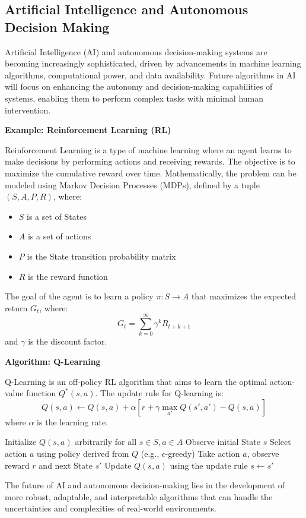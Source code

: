 \documentclass[12pt]{book} %
\begin{document}
\subsection{Artificial Intelligence and Autonomous Decision Making}
Artificial Intelligence (AI) and autonomous decision-making systems are becoming increasingly sophisticated, driven by advancements in machine learning algorithms, computational power, and data availability. Future algorithms in AI will focus on enhancing the autonomy and decision-making capabilities of systems, enabling them to perform complex tasks with minimal human intervention.

\textbf{Example: Reinforcement Learning (RL)}

Reinforcement Learning is a type of machine learning where an agent learns to make decisions by performing actions and receiving rewards. The objective is to maximize the cumulative reward over time. Mathematically, the problem can be modeled using Markov Decision Processes (MDPs), defined by a tuple \((S, A, P, R)\), where:
\begin{itemize}
    \item \(S\) is a set of States
    \item \(A\) is a set of actions
    \item \(P\) is the State transition probability matrix
    \item \(R\) is the reward function
\end{itemize}

The goal of the agent is to learn a policy \(\pi: S \to A\) that maximizes the expected return \(G_t\), where:
\[
G_t = \sum_{k=0}^{\infty} \gamma^k R_{t+k+1}
\]
and \(\gamma\) is the discount factor.

\textbf{Algorithm: Q-Learning}

Q-Learning is an off-policy RL algorithm that aims to learn the optimal action-value function \(Q^*(s, a)\). The update rule for Q-learning is:
\[
Q(s, a) \leftarrow Q(s, a) + \alpha \left[ r + \gamma \max_{a'} Q(s', a') - Q(s, a) \right]
\]
where \(\alpha\) is the learning rate.
\FloatBarrier
\begin{algorithm}
\caption{Q-Learning Algorithm}
\begin{algorithmic}[1]
\State Initialize \(Q(s, a)\) arbitrarily for all \(s \in S, a \in A\)
\State Observe initial State \(s\)
        \State Select action \(a\) using policy derived from \(Q\) (e.g., \(\epsilon\)-greedy)
        \State Take action \(a\), observe reward \(r\) and next State \(s'\)
        \State Update \(Q(s, a)\) using the update rule
        \State \(s \leftarrow s'\)
    \EndWhile
\EndFor
\end{algorithmic}
\end{algorithm}
\FloatBarrier
The future of AI and autonomous decision-making lies in the development of more robust, adaptable, and interpretable algorithms that can handle the uncertainties and complexities of real-world environments.
\end{document}
